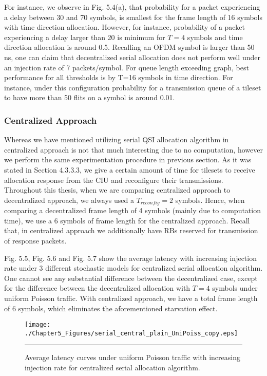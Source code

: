 For instance, we observe in Fig. 5.4(a), that probability for a packet experiencing a delay between 30 and 70 symbols, is smallest for the frame length of 16 symbols with time direction allocation. However, for instance, probability of a packet experiencing a delay larger than 20 is minimum for $T=4$ symbols and time direction allocation is around 0.5. Recalling an OFDM symbol is larger than 50 ns, one can claim that decentralized serial allocation does not perform well under an injection rate of 7 packets/symbol. For queue length exceeding graph, best performance for all thresholds is by T=16 symbols in time direction. For instance, under this configuration probability for a transmission queue of a tileset to have more than 50 flits on a symbol is around 0.01.  


\subsubsection{Centralized Approach}
Whereas we have mentioned utilizing serial QSI allocation algorithm in centralized approach is not that much interesting due to no computation, however we perform the same experimentation procedure in previous section. As it was stated in Section 4.3.3.3, we give a certain amount of time for tilesets to receive allocation response from the CIU and reconfigure their transmissions. Throughout this thesis, when we are comparing centralized approach to decentralized approach, we always used a $T_{reconfig} = 2$ symbols. Hence, when comparing a decentralized frame length of 4 symbols (mainly due to computation time), we use a 6 symbols of frame length for the centralized approach. Recall that, in centralized approach we additionally have RBs reserved for transmission of response packets. 

Fig. 5.5, Fig. 5.6 and Fig. 5.7 show the average latency with increasing injection rate under 3 different stochastic models for centralized serial allocation algorithm. One cannot see any substantial difference between the decentralized case, except for the difference between the decentralized allocation with $T=4$ symbols under uniform Poisson traffic. With centralized approach, we have a total frame length of 6 symbols, which eliminates the aforementioned starvation effect.

\begin{figure}[htbp]
  \centering
    \texttt{[image: ./Chapter5\_Figures/serial\_central\_plain\_UniPoiss\_copy.eps]}
    \rule{35em}{0.5pt}
  \caption[Centralized Serial Allocation Average latency under uniform Poisson]{Average latency curves under uniform Poisson traffic with increasing injection rate for centralized serial allocation algorithm.}
  \label{fig:Electron}
\end{figure}


